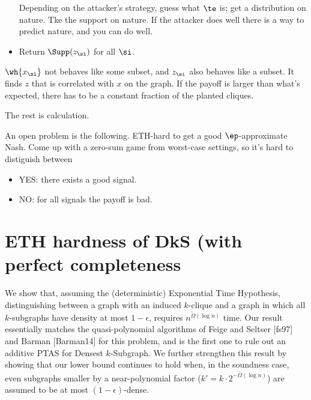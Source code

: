 \begin{itemize}
Depending on the attacker's strategy, guess what $\te$ is; get a distribution on nature. Tke the support on nature. If the attacker does well there is a way to predict nature, and you can do well.
\item
Return $\Supp(z_\si)$ for all $\si$.
\end{itemize}
$\wh{x_\si}$ not behaves like some subset, and $z_\si$ also behaves like a subset. It finds $z$ that is correlated with $x$ on the graph. If the payoff is larger than what's expected, there has to be a constant fraction of the planted cliques.

The rest is calculation.

An open problem is the following. %
ETH-hard to get a good $\ep$-approximate Nash.
Come up with a zero-sum game from worst-case settings, so it's hard to distiguish between
\begin{itemize}
\item
YES: there exists a good signal.
\item
NO: for all signals the payoff is bad.
\end{itemize}
%

\section{ETH hardness of DkS (with perfect completeness}

We show that, assuming the (deterministic) Exponential Time Hypothesis,
distinguishing between a graph with an induced $k$-clique
and a graph in which all $k$-subgraphs have density at most $1-\epsilon$,
requires $n^{\tilde{\Omega}(\log n)}$ time.
Our result essentially matches the quasi-polynomial algorithms of Feige
and Seltser [fs97] and Barman [Barman14] for this problem,
and is the first one to rule out an additive PTAS for Densest
$k$-Subgraph. We further strengthen this result by showing that our lower
bound continues to hold when, in the soundness case,
even subgraphs smaller by a near-polynomial factor ($k' = k \cdot
2^{-\tilde \Omega (\log n)}$) are assumed to be at most
$(1-\epsilon)$-dense.

